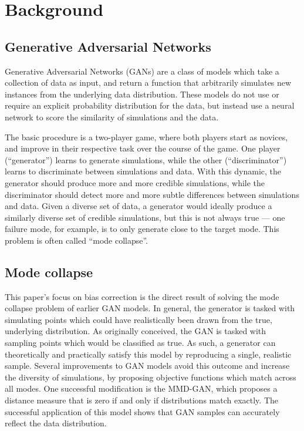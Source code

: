 \documentclass{article} %
\begin{document}
\section{Background}

\subsection{Generative Adversarial Networks}
Generative Adversarial Networks (GANs) are a class of models which take a collection of data as input, and return a function that arbitrarily simulates new instances from the underlying data distribution. These models do not use or require an explicit probability distribution for the data, but instead use a neural network to score the similarity of simulations and the data.

The basic procedure is a two-player game, where both players start as novices, and improve in their respective task over the course of the game. One player (``generator'') learns to  generate simulations, while the other (``discriminator'') learns to discriminate between simulations and data. With this dynamic, the generator should produce more and more credible simulations, while the discriminator should detect more and more subtle differences between simulations and data. Given a diverse set of data, a generator would ideally produce a similarly diverse set of credible simulations, but this is not always true --- one failure mode, for example, is to only generate close to the target mode. This problem is often called ``mode collapse''.

\subsection{Mode collapse}
This paper's focus on bias correction is the direct result of solving the mode collapse problem of earlier GAN models. In general, the generator is tasked with simulating points which could have realistically been drawn from the true, underlying distribution. As originally conceived, the GAN is tasked with sampling points which would be classified as true. As such, a generator can theoretically and practically satisfy this model by reproducing a single, realistic sample. Several improvements to GAN models avoid this outcome and increase the diversity of simulations, by proposing objective functions which match across all modes. One successful modification is the MMD-GAN, which proposes a distance measure that is zero if and only if distributions match exactly. The successful application of this model shows that GAN samples can accurately reflect the data distribution.
\end{document}
